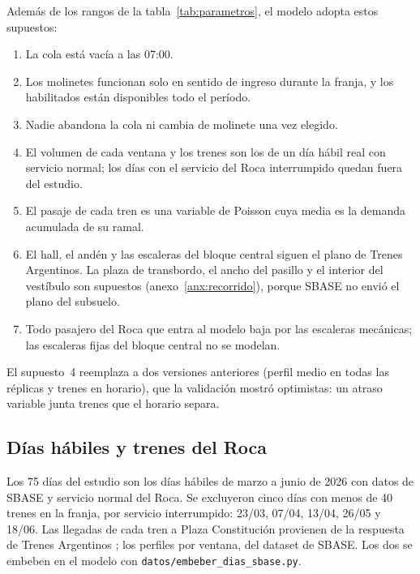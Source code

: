 Además de los rangos de la tabla~\ref{tab:parametros}, el modelo adopta estos supuestos:
\begin{enumerate}
  \item La cola está vacía a las 07:00.
  \item Los molinetes funcionan solo en sentido de ingreso durante la franja, y los habilitados están
        disponibles todo el período.
  \item Nadie abandona la cola ni cambia de molinete una vez elegido.
  \item El volumen de cada ventana y los trenes son los de un día hábil real con servicio normal; los días
        con el servicio del Roca interrumpido quedan fuera del estudio.
  \item El pasaje de cada tren es una variable de Poisson cuya media es la demanda acumulada de su ramal.
  \item El hall, el andén y las escaleras del bloque central siguen el plano de Trenes Argentinos. La plaza
        de transbordo, el ancho del pasillo y el interior del vestíbulo son supuestos
        (anexo~\ref{anx:recorrido}), porque SBASE no envió el plano del subsuelo.
  \item Todo pasajero del Roca que entra al modelo baja por las escaleras mecánicas; las escaleras fijas del
        bloque central no se modelan.
\end{enumerate}
El supuesto~4 reemplaza a dos versiones anteriores (perfil medio en todas las réplicas y trenes en
horario), que la validación mostró optimistas: un atraso variable junta trenes que el horario separa.

\subsection{Días hábiles y trenes del Roca}
\label{anx:roca}

Los 75 días del estudio son los días hábiles de marzo a junio de 2026 con datos de SBASE y servicio normal del
Roca. Se excluyeron cinco días con menos de 40 trenes en la franja, por servicio interrumpido: 23/03, 07/04,
13/04, 26/05 y 18/06. Las llegadas de cada tren a Plaza Constitución provienen de la respuesta de Trenes
Argentinos \parencite{sofse2026nota}; los perfiles por ventana, del dataset de SBASE. Los dos se embeben en el
modelo con \texttt{datos/embeber\_dias\_sbase.py}.

